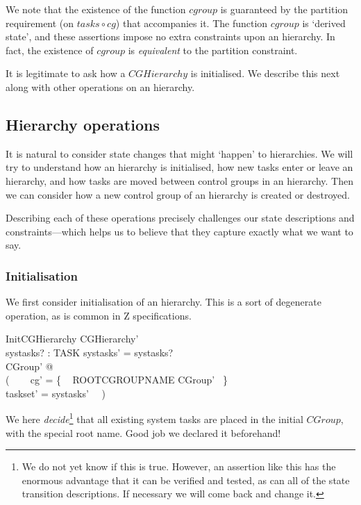 \documentclass[a4paper,twoside,12pt]{article}
\begin{document}
We note that the existence of the function $cgroup$ is guaranteed by the partition requirement 
(on $tasks \circ cg$) that accompanies it. 
The function $cgroup$ is `derived state', and these assertions impose no extra constraints upon an hierarchy. 
In fact, the existence of $cgroup$ is \emph{equivalent} to the partition constraint.

It is legitimate to ask how a $CGHierarchy$ is initialised. 
We describe this next along with other operations on an hierarchy.


\subsection{Hierarchy operations}

It is natural to consider state changes that might `happen' to hierarchies.
We will try to understand how an hierarchy is initialised, how new tasks enter or leave an hierarchy, 
and how tasks are moved between control groups in an hierarchy.
Then we can consider how a new control group of an hierarchy is created or destroyed.

Describing each of these operations precisely challenges our state descriptions and constraints---which helps us
to believe that they capture exactly what we want to say.

\subsubsection{Initialisation}

We first consider initialisation of an hierarchy. This is a sort of degenerate operation, as is common in Z specifications.

\begin{schema}{InitCGHierarchy}
CGHierarchy' \\
systasks? : \finset TASK
\where
systasks' = systasks? \\
\exists CGroup' @ \\
( ~~~ cg' = \{ ~ ROOTCGROUPNAME \mapsto \theta CGroup' ~\} \\
\land taskset' = systasks' ~~)
\end{schema}
We here \emph{decide}\footnote{We do not yet know if this is true.
However, an assertion like this has the enormous advantage that it can be verified 
and tested, as can all of the state transition descriptions. If necessary we will come back and change it.}
that all existing system tasks are placed in the initial $CGroup$, 
with the special root name. 
Good job we declared it beforehand!
\end{document}
